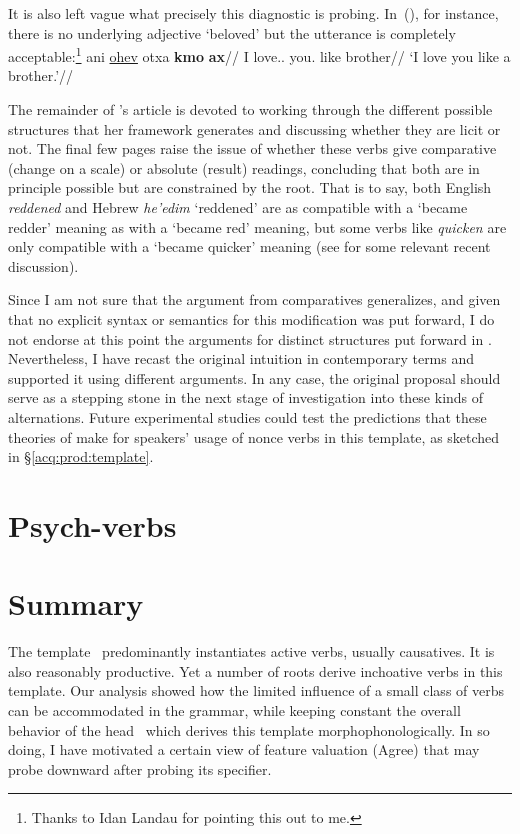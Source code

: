 It is also left vague what precisely this diagnostic is probing. In~(\nextx), for instance, there is no underlying adjective `beloved' but the utterance is completely acceptable:\footnote{Thanks to Idan Landau for pointing this out to me.}
\ex
	\begingl
	\gla ani \underline{ohev} otxa \textbf{kmo} \textbf{ax}//
	\glb I love.. you. like brother//
	\glft `I love you like a brother.'//
	\endgl
\xe

The remainder of \citeauthor{borer91}'s article is devoted to working through the different possible structures that her framework generates and discussing whether they are licit or not. The final few pages \citep[150]{borer91} raise the issue of whether these verbs give comparative (change on a scale) or absolute (result) readings, concluding that both are in principle possible but are constrained by the root. That is to say, both English \emph{reddened} and Hebrew \emph{he'edim} `reddened' are as compatible with a `became redder' meaning as with a `became red' meaning, but some verbs like \emph{quicken} are only compatible with a `became quicker' meaning (see \citealt[ch.~5]{bobaljik12} for some relevant recent discussion).

Since I am not sure that the argument from comparatives generalizes, and given that no explicit syntax or semantics for this modification was put forward, I do not endorse at this point the arguments for distinct structures put forward in \cite{borer91}. Nevertheless, I have recast the original intuition in contemporary terms and supported it using different arguments. In any case, the original proposal should serve as a stepping stone in the next stage of investigation into these kinds of alternations. Future experimental studies could test the predictions that these theories of {\thif} make for speakers' usage of nonce verbs in this template, as sketched in \S\ref{acq:prod:template}.




\section{Psych-verbs}


\section{Summary}
The template \thif~predominantly instantiates active verbs, usually causatives. It is also reasonably productive. Yet a number of roots derive inchoative verbs in this template. Our analysis showed how the limited influence of a small class of verbs can be accommodated in the grammar, while keeping constant the overall behavior of the head \vd~which derives this template morphophonologically. In so doing, I have motivated a certain view of feature valuation (Agree) that may probe downward after probing its specifier.


